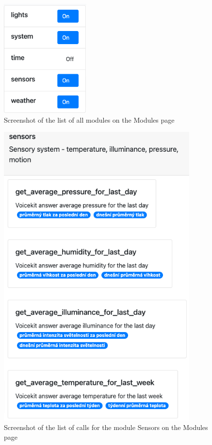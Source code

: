 \begin{figure}[H]
    \centering
    \includegraphics[width=0.4\textwidth]{img/screenshot_modules_modules.png}
    \caption{Screenshot of the list of all modules on the Modules page}
    \label{fig:screenshot_modules_modules}
\end{figure}

\begin{figure}[H]
    \centering
    \includegraphics[width=0.9\textwidth]{img/screenshot_modules_calls.png}
    \caption{Screenshot of the list of calls for the module Sensors on the Modules page}
    \label{fig:screenshot_modules_calls}
\end{figure}


